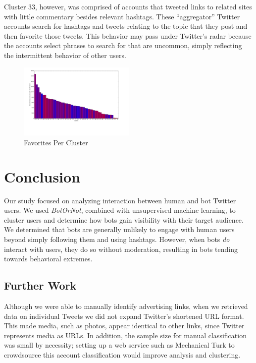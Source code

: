 \documentclass{sig-alternate-05-2015}
\begin{document}
Cluster 33, however, was comprised of accounts that tweeted links to related sites with little commentary besides relevant hashtags. These ``aggregator'' Twitter accounts search for hashtags and tweets relating to the topic that they post and then favorite those tweets. This behavior may pass under Twitter's radar because the accounts select phrases to search for that are uncommon, simply reflecting the intermittent behavior of other users.

\begin{figure}[h!]
	\caption{Favorites Per Cluster}
	\centering
		\includegraphics[width=0.5\textwidth]{imgs/favorites}
\end{figure}

\section{Conclusion}
Our study focused on analyzing interaction between human and bot Twitter users. We used \emph{BotOrNot}, combined with unsupervised machine learning, to cluster users and determine how bots gain visibility with their target audience. We determined that bots are generally unlikely to engage with human users beyond simply following them and using hashtags. However, when bots \emph{do} interact with users, they do so without moderation, resulting in bots tending towards behavioral extremes.

\subsection{Further Work}
Although we were able to manually identify advertising links, when we retrieved data on individual Tweets we did not expand Twitter's shortened URL format. This made media, such as photos, appear identical to other links, since Twitter represents media as URLs. In addition, the sample size for manual classification was small by necessity; setting up a web service such as Mechanical Turk to crowdsource this account classification would improve analysis and clustering.
\end{document}
